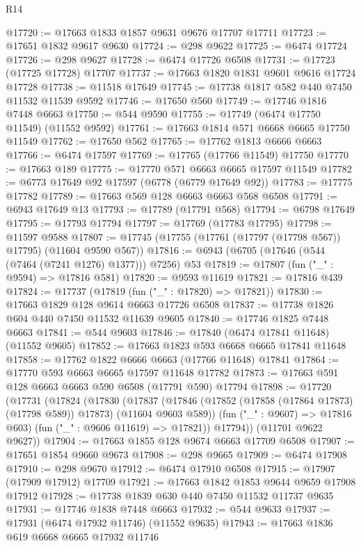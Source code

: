 \begin{lexlean}{R14}
\begin{coremodule}
@17720 := @17663 @1833 @1857 @9631 @9676 @17707 @17711
@17723 := @17651 @1832 @9617 @9630
@17724 := @298 @9622
@17725 := @6474 @17724
@17726 := @298 @9627
@17728 := @6474 @17726 @6508
@17731 := @17723 (@17725 @17728) @17707
@17737 := @17663 @1820 @1831 @9601 @9616 @17724 @17728
@17738 := @11518 @17649
@17745 := @17738 @1817 @582 @440 @7450 @11532 @11539 @9592
@17746 := @17650 @560
@17749 := @17746 @1816 @7448 @6663
@17750 := @544 @9590
@17755 := @17749 (@6474 @17750 @11549) (@11552 @9592)
@17761 := @17663 @1814 @571 @6668 @6665 @17750 @11549
@17762 := @17650 @562
@17765 := @17762 @1813 @6666 @6663
@17766 := @6474 @17597
@17769 := @17765 (@17766 @11549) @17750
@17770 := @17663 @189
@17775 := @17770 @571 @6663 @6665 @17597 @11549
@17782 := @6773 @17649 @92 @17597 (@6778 (@6779 @17649 @92))
@17783 := @17775 @17782
@17789 := @17663 @569 @128 @6663 @6663 @568 @6508
@17791 := @6943 @17649 @13
@17793 := @17789 (@17791 @568)
@17794 := @6798 @17649
@17795 := @17793 @17794
@17797 := @17769 (@17783 @17795)
@17798 := @11597 @9588
@17807 := @17745 (@17755 (@17761 (@17797 (@17798 @567)) @17795) (@11604 @9590 @567))
@17816 := @6943 (@6705 (@17646 (@544 (@7464 (@7241 @1276) @1377))) @7256) @53
@17819 := @17807 (fun ("_" : @9594) => @17816 @581)
@17820 := @9593 @11619
@17821 := @17816 @439
@17824 := @17737 (@17819 (fun ("_" : @17820) => @17821))
@17830 := @17663 @1829 @128 @9614 @6663 @17726 @6508
@17837 := @17738 @1826 @604 @440 @7450 @11532 @11639 @9605
@17840 := @17746 @1825 @7448 @6663
@17841 := @544 @9603
@17846 := @17840 (@6474 @17841 @11648) (@11552 @9605)
@17852 := @17663 @1823 @593 @6668 @6665 @17841 @11648
@17858 := @17762 @1822 @6666 @6663 (@17766 @11648) @17841
@17864 := @17770 @593 @6663 @6665 @17597 @11648 @17782
@17873 := @17663 @591 @128 @6663 @6663 @590 @6508 (@17791 @590) @17794
@17898 := @17720
    (@17731
      (@17824
        (@17830
          (@17837
            (@17846 (@17852 (@17858 (@17864 @17873) (@17798 @589)) @17873) (@11604 @9603 @589))
            (fun ("_" : @9607) => @17816 @603)
            (fun ("_" : @9606 @11619) => @17821))
          @17794))
      (@11701 @9622 @9627))
@17904 := @17663 @1855 @128 @9674 @6663 @17709 @6508
@17907 := @17651 @1854 @9660 @9673
@17908 := @298 @9665
@17909 := @6474 @17908
@17910 := @298 @9670
@17912 := @6474 @17910 @6508
@17915 := @17907 (@17909 @17912) @17709
@17921 := @17663 @1842 @1853 @9644 @9659 @17908 @17912
@17928 := @17738 @1839 @630 @440 @7450 @11532 @11737 @9635
@17931 := @17746 @1838 @7448 @6663
@17932 := @544 @9633
@17937 := @17931 (@6474 @17932 @11746) (@11552 @9635)
@17943 := @17663 @1836 @619 @6668 @6665 @17932 @11746

\end{coremodule}
\end{lexlean}
